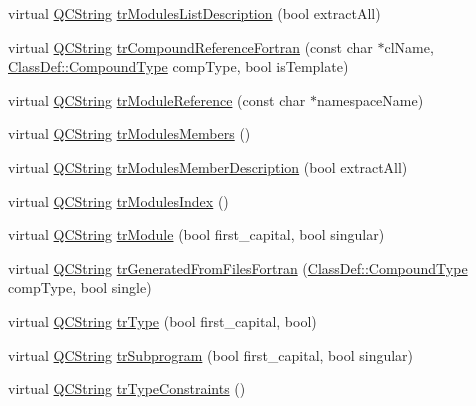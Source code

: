 \begin{DoxyCompactItemize}
\item 
virtual \hyperlink{class_q_c_string}{Q\-C\-String} \hyperlink{class_translator_catalan_a4f1ad06ac7478b9058d7f388a2b67566}{tr\-Modules\-List\-Description} (bool extract\-All)
\item 
virtual \hyperlink{class_q_c_string}{Q\-C\-String} \hyperlink{class_translator_catalan_a79d39414275f1cacb484f78806a65869}{tr\-Compound\-Reference\-Fortran} (const char $\ast$cl\-Name, \hyperlink{class_class_def_a768a6f0a6fd7e9087ff7971abbcc3f36}{Class\-Def\-::\-Compound\-Type} comp\-Type, bool is\-Template)
\item 
virtual \hyperlink{class_q_c_string}{Q\-C\-String} \hyperlink{class_translator_catalan_a5b0385db8ce8e7c8251e31867c6fa8d5}{tr\-Module\-Reference} (const char $\ast$namespace\-Name)
\item 
virtual \hyperlink{class_q_c_string}{Q\-C\-String} \hyperlink{class_translator_catalan_a75279d9914e0cc54ee5f4b15ddaa234c}{tr\-Modules\-Members} ()
\item 
virtual \hyperlink{class_q_c_string}{Q\-C\-String} \hyperlink{class_translator_catalan_a26dd0f47c7f59841f901da7f4bd19306}{tr\-Modules\-Member\-Description} (bool extract\-All)
\item 
virtual \hyperlink{class_q_c_string}{Q\-C\-String} \hyperlink{class_translator_catalan_a8a71cbe9e0669d3555731c3ebc0aae35}{tr\-Modules\-Index} ()
\item 
virtual \hyperlink{class_q_c_string}{Q\-C\-String} \hyperlink{class_translator_catalan_a894e0b632e1680e918c78fea5b9b5384}{tr\-Module} (bool first\-\_\-capital, bool singular)
\item 
virtual \hyperlink{class_q_c_string}{Q\-C\-String} \hyperlink{class_translator_catalan_ab89226b80b72b0ff8f4fca99626097ba}{tr\-Generated\-From\-Files\-Fortran} (\hyperlink{class_class_def_a768a6f0a6fd7e9087ff7971abbcc3f36}{Class\-Def\-::\-Compound\-Type} comp\-Type, bool single)
\item 
virtual \hyperlink{class_q_c_string}{Q\-C\-String} \hyperlink{class_translator_catalan_a3f96a64d9b8227625fef6aa7e326f46d}{tr\-Type} (bool first\-\_\-capital, bool)
\item 
virtual \hyperlink{class_q_c_string}{Q\-C\-String} \hyperlink{class_translator_catalan_aeceda8d8c2b8645fd2337cb38d293269}{tr\-Subprogram} (bool first\-\_\-capital, bool singular)
\item 
virtual \hyperlink{class_q_c_string}{Q\-C\-String} \hyperlink{class_translator_catalan_a196f3eb690f2748ee71f518cf02bd7fe}{tr\-Type\-Constraints} ()
\item 

\end{DoxyCompactItemize}
